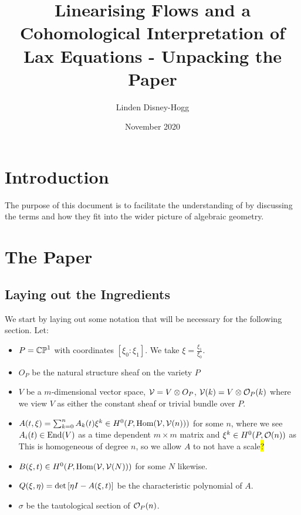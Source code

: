 \documentclass{article}
\title{Linearising Flows and a Cohomological Interpretation of Lax Equations - Unpacking the Paper}
\author{Linden Disney-Hogg}
\date{November 2020}
\begin{document}
\maketitle
\tableofcontents

\section{Introduction}
The purpose of this document is to facilitate the understanding of \cite{Griffiths1985} by discussing the terms and how they fit into the wider picture of algebraic geometry. 
\section{The Paper}

\subsection{Laying out the Ingredients}
\begin{notation}
	We start by laying out some notation that will be necessary for the following section. Let:
	\begin{itemize}
		\item $P=\mathbb{CP}^1$ with coordinates $[\xi_0:\xi_1]$. We take $\xi = \frac{\xi_1}{\xi_0}$. 
		\item $O_P$ be the natural structure sheaf on the variety $P$
		\item $V$ be a $m$-dimensional vector space, $\mathcal{V} = V \otimes O_P$, $\mathcal{V}(k) = V \otimes \mathcal{O}_P(k)$ where we view $V$ as either the constant sheaf or trivial bundle over $P$.
		\item $A(t,\xi) = \sum_{k=0}^n A_k(t) \xi^k \in  H^0(P,\operatorname{Hom}(\mathcal{V},\mathcal{V}(n)))$ for some $n$, where we see $A_i(t) \in \operatorname{End}(V)$ as a time dependent $m\times m$ matrix and $\xi^k \in H^0(P,\mathcal{O}(n))$ as
This is homogeneous of degree $n$, so we allow $A$ to not have a scale\hl{?}
        \item $B(\xi,t) \in  H^0(P,\operatorname{Hom}(\mathcal{V},\mathcal{V}(N)))$ for some $N$ likewise. 
        \item $Q(\xi,\eta) = \det\left[ \eta I - A(\xi,t) \right]$ be the characteristic polynomial of $A$.
        \item $\sigma$ be the tautological section of $\mathcal{O}_P(n)$.  
	\end{itemize}
\end{notation}
\end{document}
